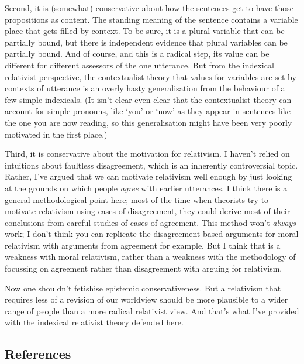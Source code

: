 \documentclass[
  11pt,
  letterpaper,
  DIV=11,
  numbers=noendperiod,
  twoside]{scrartcl}
\begin{document}
Second, it is (somewhat) conservative about how the sentences get to
have those propositions as content. The standing meaning of the sentence
contains a variable place that gets filled by context. To be sure, it is
a plural variable that can be partially bound, but there is independent
evidence that plural variables can be partially bound. And of course,
and this is a radical step, its value can be different for different
assessors of the one utterance. But from the indexical relativist
perspective, the contextualist theory that values for variables are set
by contexts of utterance is an overly hasty generalisation from the
behaviour of a few simple indexicals. (It isn't clear even clear that
the contextualist theory can account for simple pronouns, like `you' or
`now' as they appear in sentences like the one you are now reading, so
this generalisation might have been very poorly motivated in the first
place.)

Third, it is conservative about the motivation for relativism. I haven't
relied on intuitions about faultless disagreement, which is an
inherently controversial topic. Rather, I've argued that we can motivate
relativism well enough by just looking at the grounds on which people
\emph{agree} with earlier utterances. I think there is a general
methodological point here; most of the time when theorists try to
motivate relativism using cases of disagreement, they could derive most
of their conclusions from careful studies of cases of agreement. This
method won't \emph{always} work; I don't think you can replicate the
disagreement-based arguments for moral relativism with arguments from
agreement for example. But I think that is a weakness with moral
relativism, rather than a weakness with the methodology of focussing on
agreement rather than disagreement with arguing for relativism.

Now one shouldn't fetishise epistemic conservativeness. But a relativism
that requires less of a revision of our worldview should be more
plausible to a wider range of people than a more radical relativist
view. And that's what I've provided with the indexical relativist theory
defended here.

\subsection*{References}\label{references}
\end{document}
